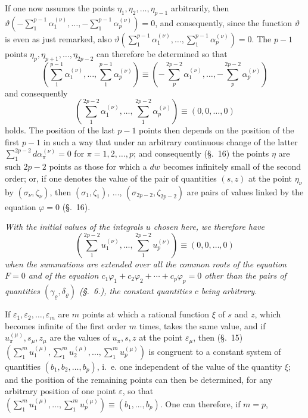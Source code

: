 \documentclass{article}
\begin{document}
If one now assumes the points $\eta_{1}, \eta_{2}, \ldots, \eta_{p-1}$ arbitrarily, then $\vartheta\left(-\displaystyle\sum_{1}^{p-1} \alpha_{1}^{(\nu)}, \ldots, -\sum_{1}^{p-1} \alpha_{p}^{(\nu)}\right) = 0$, and consequently, since the function $\vartheta$ is even as just remarked, also $\vartheta\left(\displaystyle\sum_{1}^{p-1} \alpha_{1}^{(\nu)}, \ldots, \sum_{1}^{p-1} \alpha_{p}^{(\nu)}\right) = 0$. The $p-1$ points $\eta_{p}, \eta_{p+1}, \ldots, \eta_{2p-2}$ can therefore be determined so that
\[ \left(\sum_{1}^{p-1} \alpha_{1}^{(\nu)}, \ldots, \sum_{1}^{p-1} \alpha_{p}^{(\nu)}\right) \equiv \left(-\sum_{p}^{2p-2} \alpha_{1}^{(\nu)}, \ldots, -\sum_{p}^{2p-2} \alpha_{p}^{(\nu)}\right) \]
and consequently
\[ \left(\sum_{1}^{2p-2} \alpha_{1}^{(\nu)}, \ldots, \sum_{1}^{2p-2} \alpha_{p}^{(\nu)}\right) \equiv (0, 0, \ldots, 0) \]
holds. The position of the last $p-1$ points then depends on the position of the first $p-1$ in such a way that under an arbitrary continuous change of the latter $\displaystyle\sum_{1}^{2p-2} d\alpha_{\pi}^{(\nu)} = 0$ for $\pi = 1, 2, \ldots, p$; and consequently (§.~16) the points $\eta$ are such $2p-2$ points as those for which a $dw$ becomes infinitely small of the second order; or, if one denotes the value of the pair of quantities $(s, z)$ at the point $\eta_{\nu}$ by $(\sigma_{\nu}, \zeta_{\nu})$, then $(\sigma_{1}, \zeta_{1})$, $\ldots$, $(\sigma_{2p-2}, \zeta_{2p-2})$ are pairs of values linked by the equation $\varphi = 0$ (§.~16).

\emph{With the initial values of the integrals $u$ chosen here, we therefore have}
\[ \left(\sum_{1}^{2p-2} u_{1}^{(\nu)}, \ldots, \sum_{1}^{2p-2} u_{p}^{(\nu)}\right) \equiv (0, 0, \ldots, 0) \]
\emph{when the summations are extended over all the common roots of the equation $F = 0$ and of the equation $c_{1}\varphi_{1} + c_{2}\varphi_{2} + \cdots + c_{p}\varphi_{p} = 0$ other than the pairs of quantities $(\gamma_{\varrho}, \delta_{\varrho})$ (§.~6.), the constant quantities $c$ being arbitrary.}

If $\varepsilon_{1}, \varepsilon_{2}, \ldots, \varepsilon_{m}$ are $m$ points at which a rational function $\xi$ of $s$ and $z$, which becomes infinite of the first order $m$ times, takes the same value, and if $u_{\pi}^{(\mu)}, s_{\mu}, z_{\mu}$ are the values of $u_{\pi}, s, z$ at the point $\varepsilon_{\mu}$, then (§.~15) $\left(\displaystyle\sum_{1}^{m} u_{1}^{(\mu)}, \sum_{1}^{m} u_{2}^{(\mu)}, \ldots, \sum_{1}^{m} u_{p}^{(\mu)}\right)$ is congruent to a constant system of quantities $(b_{1}, b_{2}, \ldots, b_{p})$, i.~e. one independent of the value of the quantity $\xi$; and the position of the remaining points can then be determined, for any arbitrary position of one point $\varepsilon$, so that $\left(\displaystyle\sum_{1}^{m} u_{1}^{(\mu)}, \ldots, \sum_{1}^{m} u_{p}^{(\mu)}\right) \equiv (b_{1}, \ldots, b_{p})$. One can therefore, if $m = p$,
\end{document}
